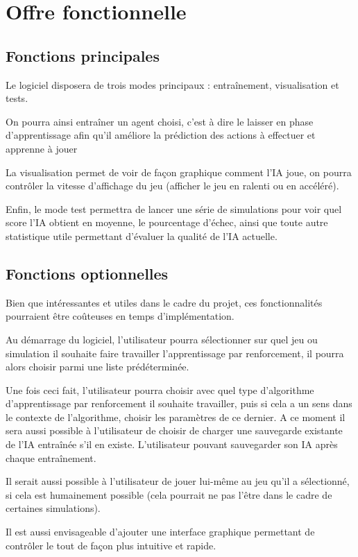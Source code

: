 \chapter{Offre fonctionnelle}
\section{Fonctions principales}
Le logiciel disposera de trois modes principaux : entraînement, visualisation et tests. \par

On pourra ainsi entraîner un agent choisi, c’est à dire le laisser en phase d’apprentissage afin qu’il améliore la prédiction des actions à effectuer et apprenne à jouer
\par
La visualisation permet de voir de façon graphique comment l’IA joue, on pourra contrôler la vitesse d’affichage du jeu (afficher le jeu en ralenti ou en accéléré).
\par
Enfin, le mode test permettra de lancer une série de simulations pour voir quel score l’IA obtient en moyenne, le pourcentage d'échec, ainsi que toute autre statistique utile permettant d’évaluer la qualité de l’IA actuelle.

\section{Fonctions optionnelles}
Bien que intéressantes et utiles dans le cadre du projet, ces fonctionnalités pourraient être coûteuses en temps d’implémentation. \par

Au démarrage du logiciel, l’utilisateur pourra sélectionner sur quel jeu ou simulation il souhaite faire travailler l’apprentissage par renforcement, il pourra alors choisir parmi une liste prédéterminée. \par
Une fois ceci fait, l’utilisateur pourra choisir avec quel type d’algorithme d’apprentissage par renforcement il souhaite travailler, puis si cela a un sens dans le contexte de l’algorithme, choisir les paramètres de ce dernier. A ce moment il sera aussi possible à l’utilisateur de choisir de charger une sauvegarde existante de l’IA entraînée s’il en existe. L’utilisateur pouvant sauvegarder son IA après chaque entraînement. \par
Il serait aussi possible à l’utilisateur de jouer lui-même au jeu qu’il a sélectionné, si cela est humainement possible (cela pourrait ne pas l’être dans le cadre de certaines simulations).
\par
Il est aussi envisageable d'ajouter une interface graphique permettant de contrôler le tout de façon plus intuitive et rapide.



